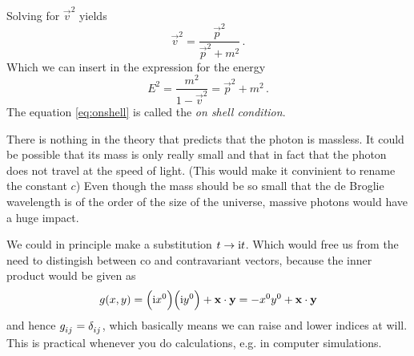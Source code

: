 Solving for $\vec{v}^2$ yields
\begin{equation}
\vec{v}^2=\frac{\vec{p}^2}{\vec{p}^2+m^2}\, .
\end{equation}
Which we can insert in the expression for the energy
\begin{equation}
E^2=\frac{m^2}{1-\vec{v}^2}=\vec{p}^2+m^2 \label{eq:onshell}\, .
\end{equation}
The equation \eqref{eq:onshell} is called the \emph{on shell condition}.
\begin{sidenote}
There is nothing in the theory that predicts that the photon is massless. It
could be possible that its mass is only really small and that in fact that the
photon does not travel at the speed of light. (This would make it
convinient to rename the constant $c$) Even though the mass should be so small
that the de Broglie wavelength is of the order of the size of the universe,
massive photons would have a huge impact.
\end{sidenote}
\begin{sidenote}
We could in principle make a substitution $t\to \mathrm{i} t$. Which would free us
from the need to distingish between co and contravariant vectors, because the
inner product would be given as
\begin{equation}
g(x,y)=\left(\imI x^0\right)\left(\imI
y^0\right)+\vec{x}\cdot\vec{y}=-x^0y^0+\vec{x}\cdot\vec{y}
\end{equation}
and hence $\tensor{g}{_i_j}=\tensor{\delta}{_i_j}$, which basically means we can
raise and lower indices at will. This is practical whenever you do calculations,
e.g. in computer simulations.
\end{sidenote}
